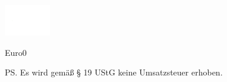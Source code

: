 \documentclass[a4paper]{scrlttr2}
\begin{document}
	\begin{letter}{\customerCompany \\ 
	\customerStreet \\ \customerZIP \ \customerCity}
	
			\includegraphics[width=0.15\textwidth]{logo.png}			
			\opening{\invoiceSalutation}
			\invoiceText
		    \begin{invoice}{Euro}{0}
			    
		    \end{invoice}
		\ps Es wird gemäß § 19 UStG keine Umsatzsteuer erhoben. 
		\closing{\invoiceClosing}
		\invoiceEnclosures



	\end{letter}
\end{document}
